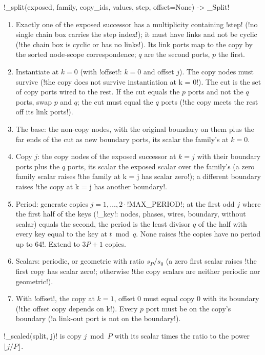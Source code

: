 {{{\begin{signature}
\lexpy!_split(exposed, family, copy_ids, values, step, offset=None) -> _Split!
\end{signature}
\begin{algorithm}\label{alg:lean-export-chain-split}\sloppy
\begin{enumerate}
\item Exactly one \bbox of the exposed successor has a multiplicity containing \lexcode!step!
(\lexcode!no single chain box carries the step index!); it must have links and not be cyclic
(\lexcode!the chain box is cyclic or has no links!). Its link ports map to the copy by the sorted
node-scope correspondence; $q$ are the second ports, $p$ the first.
\item Instantiate at $k=0$ (with \lexcode!offset!: $k=0$ and offset $j$). The copy nodes must survive
(\lexcode!the copy does not survive instantiation at k = 0!). The cut is the set of copy ports wired
to the rest. If the cut equals the $p$ ports and not the $q$ ports, swap $p$ and $q$; the cut
must equal the $q$ ports (\lexcode!the copy meets the rest off its link ports!).
\item The base: the non-copy nodes, with the original boundary on them plus the far ends of the
cut as new boundary ports, its scalar the family's at $k=0$.
\item Copy $j$: the copy nodes of the exposed successor at $k=j$ with their boundary ports plus
the $q$ ports, its scalar the exposed scalar over the family's (a zero family scalar raises
\lexcode!the family at k = j has scalar zero!); a different boundary raises
\lexcode!the copy at k = j has another boundary!.
\item Period: generate copies $j = 1, \ldots, 2\cdot$\lexpy!MAX_PERIOD!; at the first odd $j$ where
the first half of the keys (\lexpy!_key!: nodes, phases, wires, boundary, without scalar) equals the
second, the period is the least divisor $q$ of the half with every key equal to the key at
$t \bmod q$. None raises \lexcode!the copies have no period up to 64!. Extend to $3P+1$ copies.
\item Scalars: periodic, or geometric with ratio $s_P/s_0$ (a zero first scalar raises
\lexcode!the first copy has scalar zero!; otherwise \lexcode!the copy scalars are neither periodic nor geometric!).
\item With \lexcode!offset!, the copy at $k=1$, offset 0 must equal copy 0 with its boundary
(\lexcode!the offset copy depends on k!). Every $p$ port must be on the copy's boundary
(\lexcode!a link-out port is not on the boundary!).
\end{enumerate}
\end{algorithm}
\lexpy!_scaled(split, j)! is copy $j \bmod P$ with its scalar times the ratio to the power
$\lfloor j/P\rfloor$.

}}}
